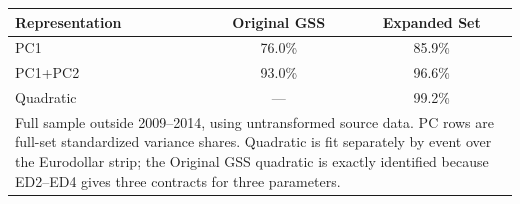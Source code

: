\begin{tabular}{lcc}
\toprule
Representation & Original GSS & Expanded Set \\
\midrule
PC1 & 76.0\% & 85.9\% \\
PC1+PC2 & 93.0\% & 96.6\% \\
Quadratic & --- & 99.2\% \\
\midrule
\multicolumn{3}{p{0.72\linewidth}}{\footnotesize Full sample outside 2009--2014, using untransformed source data. PC rows are full-set standardized variance shares. Quadratic is fit separately by event over the Eurodollar strip; the Original GSS quadratic is exactly identified because ED2--ED4 gives three contracts for three parameters.}\\
\bottomrule
\end{tabular}
